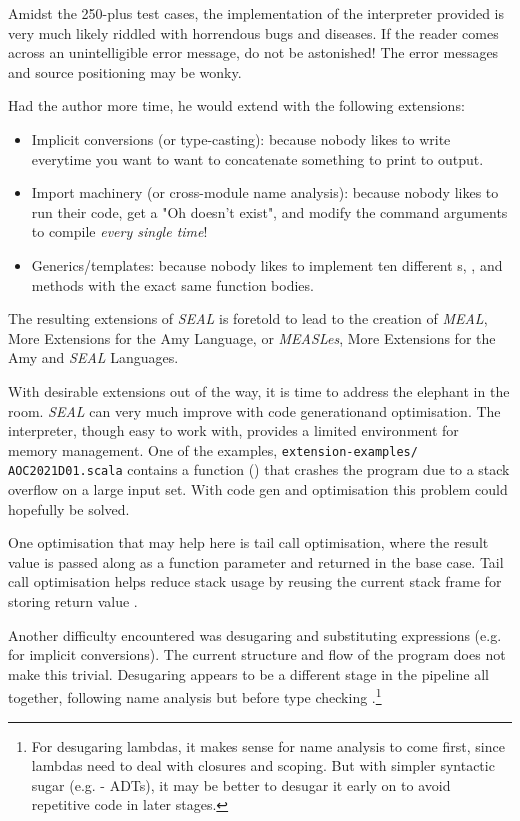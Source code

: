 Amidst the 250-plus test cases, the implementation of the  interpreter provided is very much likely riddled with horrendous bugs and diseases. If the reader comes across an unintelligible error message, do not be astonished! The error messages and source positioning may be wonky.

Had the author more time, he would extend  with the following extensions:
\begin{itemize}
    \item Implicit conversions (or type-casting): because nobody likes to write  everytime you want to want to concatenate something to print to output.
    \item Import machinery (or cross-module name analysis): because nobody likes to run their code, get a "Oh  doesn't exist", and modify the command arguments to compile  \textit{every single time}!
    \item Generics/templates: because nobody likes to implement ten different s, , and  methods with the exact same function bodies.
\end{itemize}

\noindent
The resulting extensions of \textit{SEAL} is foretold to lead to the creation of \textit{MEAL}, More Extensions for the Amy Language, or \textit{MEASLes}, More Extensions for the Amy and \textit{SEAL} Languages.

With desirable extensions out of the way, it is time to address the elephant in the room. \textit{SEAL} can very much improve with code generation\footnotemark and optimisation. The interpreter, though easy to work with, provides a limited environment for memory management. One of the examples, \texttt{extension-examples/ AOC2021D01.scala} contains a function () that crashes the program due to a stack overflow on a large input set. With code gen and optimisation this problem could hopefully be solved.

One optimisation that may help here is tail call optimisation, where the result value is passed along as a function parameter and returned in the base case. Tail call optimisation helps reduce stack usage by reusing the current stack frame for storing return value \cite{TCO}.

Another difficulty encountered was desugaring and substituting expressions (e.g. for implicit conversions). The current structure and flow of the program does not make this trivial. Desugaring appears to be a different stage in the pipeline all together, following name analysis but before type checking \cite{Desugar}.\footnote{For desugaring lambdas, it makes sense for name analysis to come first, since lambdas need to deal with closures and scoping. But with simpler syntactic sugar (e.g. - ADTs), it may be better to desugar it early on to avoid repetitive code in later stages.}

